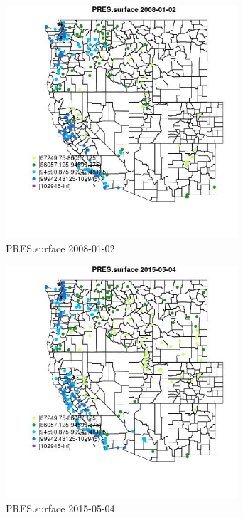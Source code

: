 \begin{figure} 
\centering  
\includegraphics[width=0.77\textwidth]{Code_Outputs/Report_ML_input_PM25_Step4_part_e_de_duplicated_aves_compiled_2019-05-18wNAs_MapObsPRESsurface2008-01-02.jpg} 
\caption{\label{fig:Report_ML_input_PM25_Step4_part_e_de_duplicated_aves_compiled_2019-05-18wNAsMapObsPRESsurface2008-01-02}PRES.surface 2008-01-02} 
\end{figure} 
 

\begin{figure} 
\centering  
\includegraphics[width=0.77\textwidth]{Code_Outputs/Report_ML_input_PM25_Step4_part_e_de_duplicated_aves_compiled_2019-05-18wNAs_MapObsPRESsurface2015-05-04.jpg} 
\caption{\label{fig:Report_ML_input_PM25_Step4_part_e_de_duplicated_aves_compiled_2019-05-18wNAsMapObsPRESsurface2015-05-04}PRES.surface 2015-05-04} 
\end{figure} 
 

